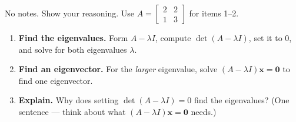 \documentclass[10pt]{article}
\newcommand{\xx}{\mathbf{x}}
\newcommand{\zero}{\mathbf{0}}
\begin{document}
\namedateperiod

\vspace{0.15in}

No notes. Show your reasoning. Use $A=\begin{bmatrix} 2 & 2 \\ 1 & 3 \end{bmatrix}$ for items 1--2.

\begin{enumerate}[leftmargin=1.8em, itemsep=14pt]
  \item \textbf{Find the eigenvalues.} Form $A-\lambda I$, compute $\det(A-\lambda I)$, set it to $0$,
        and solve for both eigenvalues $\lambda$.
        \vspace{1.6cm}
  \item \textbf{Find an eigenvector.} For the \emph{larger} eigenvalue, solve $(A-\lambda I)\xx=\zero$
        to find one eigenvector.
        \vspace{1.5cm}
  \item \textbf{Explain.} Why does setting $\det(A-\lambda I)=0$ find the eigenvalues? (One sentence ---
        think about what $(A-\lambda I)\xx=\zero$ needs.)
\end{enumerate}
\end{document}
